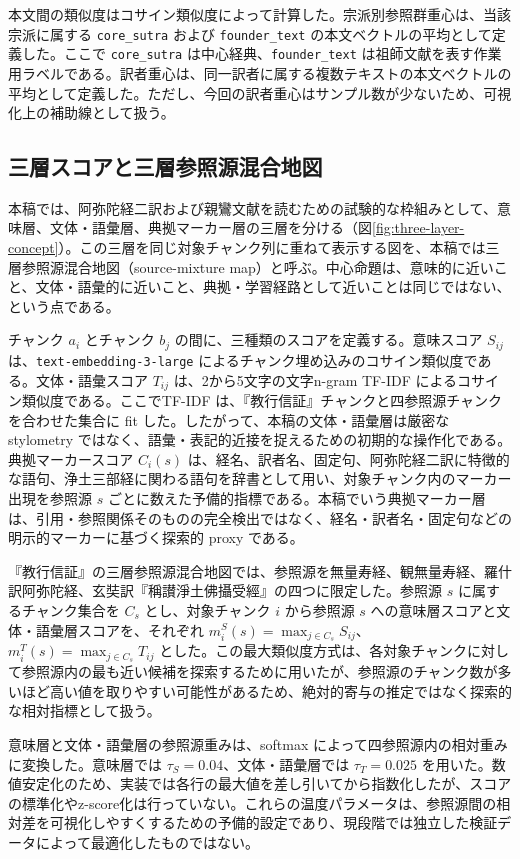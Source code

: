 \documentclass[uplatex,dvipdfmx,11pt,a4paper]{jsarticle}
\begin{document}
本文間の類似度はコサイン類似度によって計算した。宗派別参照群重心は、当該宗派に属する \texttt{core\_sutra} および \texttt{founder\_text} の本文ベクトルの平均として定義した。ここで \texttt{core\_sutra} は中心経典、\texttt{founder\_text} は祖師文献を表す作業用ラベルである。訳者重心は、同一訳者に属する複数テキストの本文ベクトルの平均として定義した。ただし、今回の訳者重心はサンプル数が少ないため、可視化上の補助線として扱う。

\subsection{三層スコアと三層参照源混合地図}

本稿では、阿弥陀経二訳および親鸞文献を読むための試験的な枠組みとして、意味層、文体・語彙層、典拠マーカー層の三層を分ける（図\ref{fig:three-layer-concept}）。この三層を同じ対象チャンク列に重ねて表示する図を、本稿では三層参照源混合地図（source-mixture map）と呼ぶ。中心命題は、意味的に近いこと、文体・語彙的に近いこと、典拠・学習経路として近いことは同じではない、という点である。

チャンク $a_i$ とチャンク $b_j$ の間に、三種類のスコアを定義する。意味スコア $S_{ij}$ は、\texttt{text-embedding-3-large} によるチャンク埋め込みのコサイン類似度である。文体・語彙スコア $T_{ij}$ は、2から5文字の文字n-gram TF-IDF によるコサイン類似度である。ここでTF-IDF は、『教行信証』チャンクと四参照源チャンクを合わせた集合に fit した。したがって、本稿の文体・語彙層は厳密な stylometry ではなく、語彙・表記的近接を捉えるための初期的な操作化である。典拠マーカースコア $C_i(s)$ は、経名、訳者名、固定句、阿弥陀経二訳に特徴的な語句、浄土三部経に関わる語句を辞書として用い、対象チャンク内のマーカー出現を参照源 $s$ ごとに数えた予備的指標である。本稿でいう典拠マーカー層は、引用・参照関係そのものの完全検出ではなく、経名・訳者名・固定句などの明示的マーカーに基づく探索的 proxy である。

『教行信証』の三層参照源混合地図では、参照源を無量寿経、観無量寿経、羅什訳阿弥陀経、玄奘訳『稱讃淨土佛攝受經』の四つに限定した。参照源 $s$ に属するチャンク集合を $C_s$ とし、対象チャンク $i$ から参照源 $s$ への意味層スコアと文体・語彙層スコアを、それぞれ $m_i^S(s)=\max_{j\in C_s} S_{ij}$、$m_i^T(s)=\max_{j\in C_s} T_{ij}$ とした。この最大類似度方式は、各対象チャンクに対して参照源内の最も近い候補を探索するために用いたが、参照源のチャンク数が多いほど高い値を取りやすい可能性があるため、絶対的寄与の推定ではなく探索的な相対指標として扱う。

意味層と文体・語彙層の参照源重みは、softmax によって四参照源内の相対重みに変換した。意味層では $\tau_S=0.04$、文体・語彙層では $\tau_T=0.025$ を用いた。数値安定化のため、実装では各行の最大値を差し引いてから指数化したが、スコアの標準化やz-score化は行っていない。これらの温度パラメータは、参照源間の相対差を可視化しやすくするための予備的設定であり、現段階では独立した検証データによって最適化したものではない。
\end{document}
